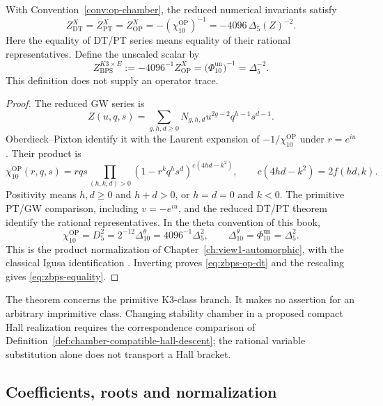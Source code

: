 \begin{theorem}
\label{thm:zbps-level-n-shadow}
With Convention~\ref{conv:op-chamber}, the reduced numerical
invariants satisfy
\begin{equation}\label{eq:zbps-op-dt}
 Z^X_{\mathrm{DT}}=Z^X_{\mathrm{PT}}=Z^X_{\mathrm{OP}}
 =-(\chi_{10}^{\mathrm{OP}})^{-1}
 =-4096\,\Delta_5(Z)^{-2}.
\end{equation}
Here the equality of DT/PT series means equality of their rational
representatives.  Define the unscaled scalar by
\begin{equation}\label{eq:zbps-equality}
 Z_{\mathrm{BPS}}^{K3\times E}:=-4096^{-1}Z^X_{\mathrm{OP}}
 =\bigl(\Phi_{10}^{\mathrm{un}}\bigr)^{-1}=\Delta_5^{-2}.
\end{equation}
This definition does not supply an operator trace.
\end{theorem}
\begin{proof}
The reduced GW series is
\[
 Z(u,q,s)=\sum_{g,h,d\ge0}N_{g,h,d}u^{2g-2}q^{h-1}s^{d-1}.
\]
Oberdieck--Pixton identify it with the Laurent expansion of
\(-1/\chi_{10}^{\mathrm{OP}}\) under \(r=e^{iu}\)
\cite[Theorem~1]{OB}.  Their product is
\[
 \chi_{10}^{\mathrm{OP}}(r,q,s)
 =rqs\prod_{(h,k,d)>0}(1-r^kq^hs^d)^{c(4hd-k^2)},
 \qquad c(4hd-k^2)=2f(hd,k).
\]
Positivity means \(h,d\ge0\) and \(h+d>0\), or \(h=d=0\)
and \(k<0\).  The primitive PT/GW comparison, including
\(v=-e^{iu}\), and the reduced DT/PT theorem identify the
rational representatives.  In the theta convention of this book,
\begin{equation}\label{eq:zbps-op-monic}
 \chi_{10}^{\mathrm{OP}}=D_5^2
 =2^{-12}\Delta_{10}^{\theta}=4096^{-1}\Delta_5^2,
 \qquad \Delta_{10}^{\theta}=\Phi_{10}^{\mathrm{un}}=\Delta_5^2.
\end{equation}
This is the product normalization of Chapter~\ref{ch:view1-automorphic},
with the classical Igusa identification
\cite{Igusa1962,Igusa1964II}.  Inverting proves
\eqref{eq:zbps-op-dt} and the rescaling gives
\eqref{eq:zbps-equality}.
\end{proof}

The theorem concerns the primitive K3-class branch.  It makes no
assertion for an arbitrary imprimitive class.  Changing stability
chamber in a proposed compact Hall realization requires the
correspondence comparison of
Definition~\ref{def:chamber-compatible-hall-descent}; the rational
variable substitution alone does not transport a Hall bracket.

\subsection{Coefficients, roots and normalization}
\label{subsec:zbps-coefficients}

